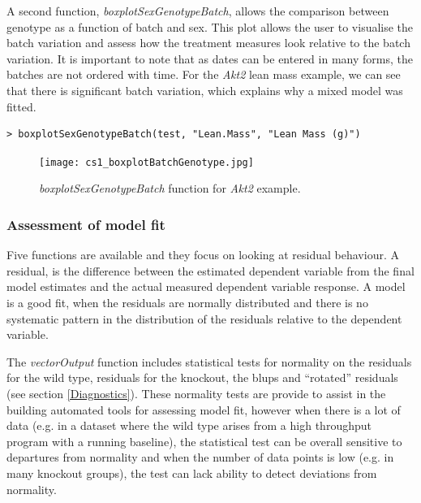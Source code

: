 \documentclass[12pt,a4paper]{article}
\begin{document}
A second function, \textit{boxplotSexGenotypeBatch}, allows the comparison between genotype as a function of batch and sex.  
This plot allows the user to visualise the batch variation and assess how the treatment measures look relative to the batch variation. 
It is important to note that as dates can be entered in many forms, the batches are not ordered with time. 
For the \textit{Akt2} lean mass example, we can see that there is significant batch variation, which explains why a mixed model was fitted.

\begingroup
    \fontsize{8pt}{12pt}\selectfont
\begin{verbatim}
> boxplotSexGenotypeBatch(test, "Lean.Mass", "Lean Mass (g)")
\end{verbatim}
\endgroup 

\begin{figure}[H]%
\centerline{\texttt{[image: cs1\_boxplotBatchGenotype.jpg]}}
\caption{\textit{boxplotSexGenotypeBatch} function for \textit{Akt2} example.}\label{fig:16}
\end{figure}

\subsubsection{Assessment of model fit}

Five functions are available and they focus on looking at residual behaviour. 
A residual, is the difference between the estimated dependent variable from the final model estimates and the actual measured dependent variable response. 
A model is a good fit, when the residuals are normally distributed and there is no systematic pattern in the distribution of the residuals relative to the dependent variable. 

The \textit{vectorOutput} function includes statistical tests for normality on the residuals for the wild type, residuals for the knockout, the blups and ``rotated'' residuals (see section \ref{Diagnostics}). 
These normality tests are provide to assist in the building automated tools for assessing model fit, 
however when there is a lot of data (e.g. in a dataset where the wild type arises from a high throughput program with a running baseline), 
the statistical test can be overall sensitive to departures from normality and when the number of data points is low (e.g. in many knockout groups), the test can lack ability to detect deviations from normality. 
\end{document}
